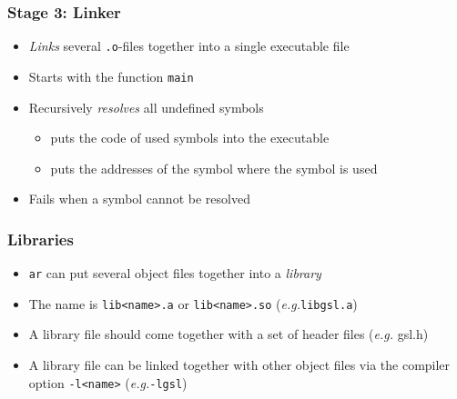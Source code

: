 \documentclass{slides}
\newcommand{\eg}{\textit{e.\thinspace g.}\xspace}
\begin{document}
\begin{frame}[fragile]
  \frametitle{Stage 3: Linker}

  \begin{itemize}
  \item \emph{Links} several \lstinline!.o!-files together into a
    single executable file
  \item Starts with the function \texttt{main}
  \item Recursively \emph{resolves} all undefined symbols
    \begin{itemize}
    \item puts the code of used symbols into the executable
    \item puts the addresses of the symbol where the symbol is used
    \end{itemize}
  \item Fails when a symbol cannot be resolved
  \end{itemize}
\end{frame}

\begin{frame}[fragile]
  \frametitle{Libraries}
  \begin{itemize}
  \item \lstinline!ar! can put several object files together into a
    \emph{library}
  \item The name is \lstinline!lib<name>.a! or
    \lstinline!lib<name>.so! (\eg \lstinline!libgsl.a!)
  \item A library file should come together with a set of header files
    (\eg gsl.h)
  \item A library file can be linked together with other object files
    via the compiler option \texttt{-l<name>} (\eg \texttt{-lgsl})
  \end{itemize}
\end{frame}
\end{document}
